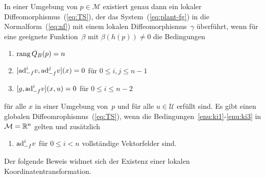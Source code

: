 \begin{theorem}
\label{thm:existence}In einer Umgebung von $p\in\mathcal{M}$ existiert
genau dann ein lokaler Diffeomorphismus~(\ref{eq:TS}), der das System~(\ref{eq:plant-fg})
in die Normalform~(\ref{eq:nf}) mit einem lokalen Diffeomorphismus~$\gamma$
überführt, wenn für eine geeignete Funktion~$\beta$ mit $\beta(h(p))\neq0$
die Bedingungen
\begin{enumerate}
\item \label{enu:ki1}${\operatorname{rang}}\,Q_{B}(p)=n$

\item \label{enu:ki2}$[{\operatorname{ad}}_{-f}^{i}v,{\operatorname{ad}}_{-f}^{j}v](x)=0$ für $0\leq i,j\leq n-1$
\item \label{enu:ki3}$[g,{\operatorname{ad}}_{-f}^{i}v](x,u)=0$ für $0\leq i\leq n-2$
\end{enumerate}
für alle $x$ in einer Umgebung von~$p$ und für alle $u\in\mathcal{U}$
erfüllt sind. Es gibt einen globalen Diffeomrophismus~(\ref{eq:TS}),
wenn die Bedingungen~\ref{enu:ki1}-\ref{enu:ki3} in $\mathcal{M}={\mathbb{R}}^{n}$
gelten und zusätzlich
\begin{enumerate}[start=4]
\item \label{enu:ki4}${\operatorname{ad}}_{-f}^{i}v$ für $0\leq i<n$ vollständige Vektorfelder
sind.
\end{enumerate}
\end{theorem}
Der folgende Beweis widmet sich der Existenz einer lokalen Koordinatentransformation. 
